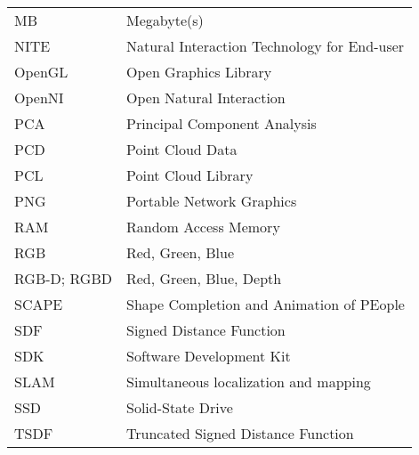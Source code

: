 \begin{longtable}{@{}p{}p{}@{}}
         MB & Megabyte(s) \\
       NITE & Natural Interaction Technology for End-user \\
     OpenGL & Open Graphics Library \\
     OpenNI & Open Natural Interaction \\
        PCA & Principal Component Analysis \\
        PCD & Point Cloud Data \\
        PCL & Point Cloud Library \\
        PNG & Portable Network Graphics \\
        RAM & Random Access Memory \\
        RGB & Red, Green, Blue \\
RGB-D; RGBD & Red, Green, Blue, Depth \\
      SCAPE & Shape Completion and Animation of PEople \\
        SDF & Signed Distance Function \\
        SDK & Software Development Kit \\
       SLAM & Simultaneous localization and mapping \\
        SSD & Solid-State Drive \\
       TSDF & Truncated Signed Distance Function \\
\end{longtable}

